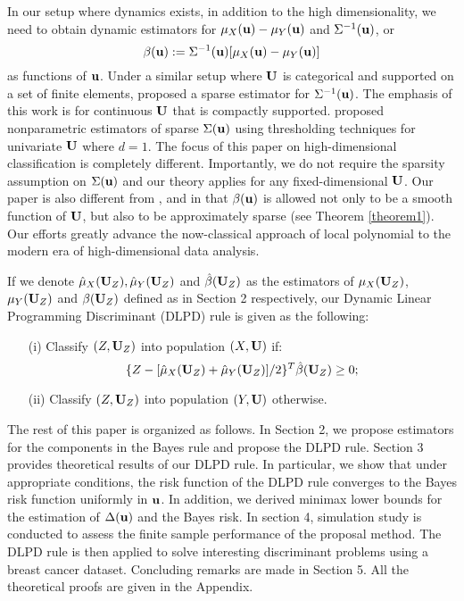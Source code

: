 \documentclass[11pt]{article}
\theoremstyle{definition}
\begin{document}
 
 In our setup where dynamics exists, in addition to the high dimensionality, we need to obtain dynamic estimators for
 $\mu_X({\bf u})-\mu_Y({\bf u})$ and $\Sigma^{-1}({\bf u})$, or
 \[\beta({\bf u}):=\Sigma^{-1}({\bf u})[\mu_X({\bf u})-\mu_Y({\bf u})]\] as functions of ${\bf u}$. Under a similar setup where ${\bf U}$ is categorical and supported on a set of finite elements,  \cite{Guo} proposed a sparse estimator for
 $\Sigma^{-1}({\bf u})$. The emphasis of this work is for continuous ${\bf U}$ that is compactly supported. \cite{Ziqi} proposed
 nonparametric estimators of sparse $\Sigma({\bf u})$ using thresholding
 techniques for univariate ${\bf U}$ where $d=1$. The focus of this paper on
 high-dimensional classification is completely different. Importantly, we do
 not require the sparsity assumption on  $\Sigma({\bf u})$ and our theory applies for any fixed-dimensional ${\bf U}$. Our paper is also different from \cite{Cai},
 \cite{Fan2012} and \cite{Maiqing2012} in that $\beta(\bf u)$ is allowed not only to be a smooth function of ${\bf U}$, but also to be approximately sparse (see Theorem \ref{theorem1}). Our efforts greatly advance the now-classical approach of local polynomial \citep{Fan1996} to the modern era of high-dimensional data analysis.
 
 
 
 If we denote  $\hat{\mu}_X({\bf U}_Z), \hat{\mu}_Y({\bf U}_Z)$ and $\hat{\beta}({\bf U}_Z)$ as
 the estimators of $\mu_X({\bf U}_Z)$, $\mu_Y({\bf U}_Z)$ and $\beta({\bf U}_Z)$ defined as in
 Section 2 respectively, our Dynamic Linear Programming Discriminant (DLPD)
 rule is given as the following:
 
 \begin{itemize}
 	\item[(i)] Classify $(Z, {\bf U}_Z)$ into population $(X, {\bf U})$ if:
 	\[\{Z-[\hat{\mu}_X({\bf U}_Z)+\hat{\mu}_Y({\bf U}_Z)]/2\}^T\hat{\beta}({\bf U}_Z)\geq 0;\]
 	\item[(ii)] Classify $(Z, {\bf U}_Z)$ into population $(Y, {\bf U})$ otherwise.
 \end{itemize}
 
 The rest of this paper is organized as follows. In Section 2, we propose
 estimators for the components in the Bayes rule and propose the DLPD rule. Section 3 provides theoretical results of our DLPD rule. In particular, we show that under appropriate conditions,
 the risk function of the DLPD rule converges to the Bayes risk function
 uniformly in ${\bf u}$. In addition, we derived minimax lower bounds for the estimation of $\Delta({\bf u})$ and the Bayes risk. In section 4, simulation study is conducted to assess the finite sample performance of the proposal method. The DLPD rule is then applied to solve interesting
 discriminant problems using %
 a breast cancer dataset.  Concluding remarks are made in Section 5. All the theoretical proofs are given in the Appendix.%
 
\end{document}
